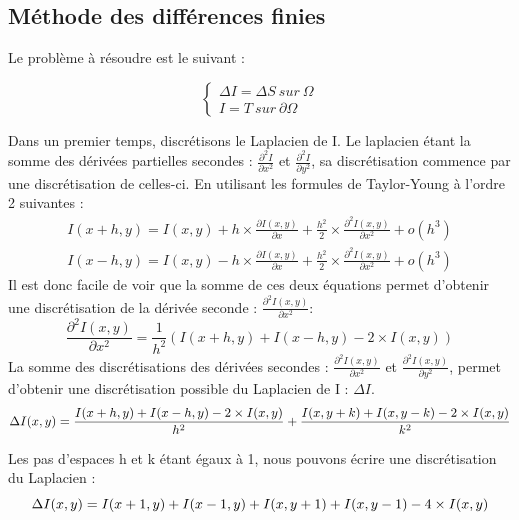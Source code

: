 \subsection{Méthode des différences finies }
Le problème à résoudre est le suivant : 
\begin{center}

\begin{equation*}
    \left \{
    \begin{aligned}
    \Delta I = \Delta S \ sur \ \Omega\\
    I = T \ sur \ \partial \Omega
    \end{aligned}
    \right.
\end{equation*}
\end{center}
Dans un premier temps, discrétisons le Laplacien de I. Le laplacien étant la somme des dérivées partielles secondes : $\frac{\partial^2 I}{\partial x^2}$ et  $\frac{\partial^2 I}{\partial y^2}$, sa discrétisation commence par une discrétisation de celles-ci. En utilisant les formules de Taylor-Young à l'ordre 2 suivantes :
\begin{equation*}
\begin{aligned}
    I(x+h,y) = I(x,y)+h\times \frac{\partial I(x,y)}{\partial x}+ \frac{h^2}{2} \times \frac{\partial ^2 I(x,y)}{\partial x^2} + o(h^3) \\
    I(x-h,y) =I(x,y)- h\times  \frac{\partial I(x,y)}{\partial x}+ \frac{h^2}{2} \times \frac{\partial^2 I(x,y)}{\partial x^2} + o(h^3)
\end{aligned}
\end{equation*}
Il est donc facile de voir que la somme de ces deux équations permet d'obtenir une discrétisation de la dérivée seconde : $\frac{\partial ^2 I(x,y)}{\partial x^2}$:  
\begin{equation*}
    \frac{\partial ^2 I(x,y)}{\partial x^2} =\frac{1}{h^2}\left( I(x+h,y) + I(x-h,y) - 2\times I(x,y)\right)
\end{equation*}
La somme des discrétisations des dérivées secondes : $\frac{\partial ^2 I(x,y)}{\partial x^2}$ et $\frac{\partial ^2 I(x,y)}{\partial y^2}$, permet d'obtenir une discrétisation possible du Laplacien de I : $\Delta I$.
\begin{equation*}
    \Delta I(x,y) =  \frac{I(x+h,y) + I(x-h,y) - 2\times I(x,y)}{h^2}  + \frac{I(x,y+k) + I(x,y-k) - 2\times I(x,y)}{k^2} \\
\end{equation*}

Les pas d'espaces h et k étant égaux à 1, nous pouvons écrire une discrétisation du Laplacien  :
\begin{equation*}
     \Delta I(x,y) =  I(x+1,y) + I(x-1,y)+ I(x,y+1) + I(x,y-1) - 4\times I(x,y)  \\
\end{equation*}

